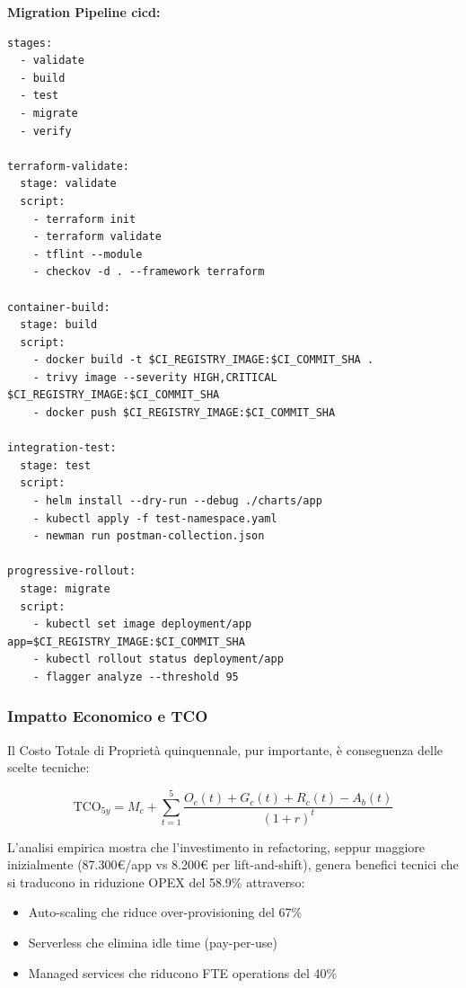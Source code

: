 \textbf{Migration Pipeline \gls{cicd}:}
\begin{lstlisting}[caption={GitLab CI per Migrazione Progressiva},label={lst:migration_pipeline}]
stages:
  - validate
  - build
  - test
  - migrate
  - verify

terraform-validate:
  stage: validate
  script:
    - terraform init
    - terraform validate
    - tflint --module
    - checkov -d . --framework terraform

container-build:
  stage: build
  script:
    - docker build -t $CI_REGISTRY_IMAGE:$CI_COMMIT_SHA .
    - trivy image --severity HIGH,CRITICAL $CI_REGISTRY_IMAGE:$CI_COMMIT_SHA
    - docker push $CI_REGISTRY_IMAGE:$CI_COMMIT_SHA

integration-test:
  stage: test
  script:
    - helm install --dry-run --debug ./charts/app
    - kubectl apply -f test-namespace.yaml
    - newman run postman-collection.json

progressive-rollout:
  stage: migrate
  script:
    - kubectl set image deployment/app app=$CI_REGISTRY_IMAGE:$CI_COMMIT_SHA
    - kubectl rollout status deployment/app
    - flagger analyze --threshold 95
\end{lstlisting}

\subsubsection{\texorpdfstring{\textbf{Impatto Economico e TCO}}{3.4.1.4 - Impatto Economico e TCO}}

Il Costo Totale di Proprietà quinquennale, pur importante, è conseguenza delle scelte tecniche:

\begin{equation}
\text{TCO}_{5y} = M_c + \sum_{t=1}^{5} \frac{O_c(t) + G_c(t) + R_c(t) - A_b(t)}{(1+r)^t}
\end{equation}

L'analisi empirica mostra che l'investimento in refactoring, seppur maggiore inizialmente (87.300€/app vs 8.200€ per lift-and-shift), genera benefici tecnici che si traducono in riduzione OPEX del 58.9\% attraverso:
\begin{itemize}
    \item Auto-scaling che riduce over-provisioning del 67\%
    \item Serverless che elimina idle time (pay-per-use)
    \item Managed services che riducono FTE operations del 40\%
\end{itemize}

